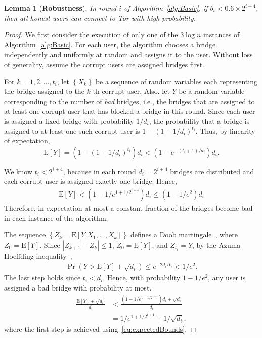 \documentclass[letterpaper,twocolumn,10pt]{article}
\newcommand{\ie}{i.e.}
\newcommand{\E}{\mathbf{\mathrm{E}}}
\newcommand{\jared}[1]{}
\newtheorem{lemma}{Lemma}
\newcommand{\sfsize}{\fontsize{0.73\baselineskip}{0.73\baselineskip}\selectfont}
\newcommand{\sans}[1]{\textsf{\sfsize \mbox{#1}}}
\newcommand{\sansb}[1]{\textbf{\sans{\mbox{#1}}}}
\begin{document}
\begin{lemma}[\sansb{Robustness}] \label{lem:robustness}
	In round $i$ of Algorithm~\ref{alg:Basic}, if ${b_i < 0.6 \times 2^{i+4}}$, then all honest users can connect to Tor with high probability.
\end{lemma}
\begin{proof}
	We first consider the execution of only one of the $3\log{n}$ instances of Algorithm~\ref{alg:Basic}. For each user, the algorithm chooses a bridge independently and uniformly at random and assigns it to the user. Without loss of generality, assume the corrupt users are assigned bridges first.
	
	For ${k=1,2,...,t_i}$, let $\left\{X_k\right\}$ be a sequence of random variables each representing the bridge assigned to the $k$-th corrupt user. Also, let $Y$ be a random variable corresponding to the number of \emph{bad} bridges, \ie, the bridges that are assigned to at least one corrupt user that has blocked a bridge in this round.  Since each user is assigned a fixed bridge with probability $1/d_i$, the probability that a bridge is assigned to at least one such corrupt user is ${1-(1-1/d_i)^{t_i}}$.  Thus, by linearity of expectation,
	\[\E[Y] = \left(1 - \left(1-1/d_i\right)^{t_i}\right)d_i < (1 - e^{-(t_i+1)/d_i})d_i.\]
	
	We know ${t_i < 2^{i+4}}$, because in each round ${d_i = 2^{i+4}}$ bridges are distributed and each corrupt user is assigned exactly one bridge. \jared{This is confusing.  You say that Y is the number of bridges assigned to at least one corrupt user, but then you use $t_i$ here which only counts the number of corrupt users that have *blocked* bridges.} Hence, 
	\begin{align}
	\E[Y] < (1 - 1/e^{1+1/2^{i+4}})d_i \leq (1 - 1/e^2)d_i \label{eq:expectedBounds}
	\end{align}
	Therefore, in expectation at most a constant fraction of the bridges become bad in each instance of the algorithm. 
	
	The sequence ${\left\{Z_k = \E[Y|X_1,...,X_k]\right\}}$ defines a Doob martingale~\cite[Chapter~5]{dubhashi:2009}, where ${Z_0 = \E[Y]}$.  Since ${|Z_{k+1} - Z_k| \leq 1}$, ${Z_0 = \E[Y]}$, and ${Z_{t_i} = Y}$, by the Azuma-Hoeffding inequality~\cite[Theorem 5.2]{dubhashi:2009},
	\begin{align}
	\Pr(Y > \E[Y] + \sqrt{d_i}) \leq e^{-2d_i/t_i} < 1/e^2. \label{eq:p1}
	\end{align}
	The last step holds since ${t_i < d_i}$. Hence, with probability $1-1/e^2$, any user is assigned a bad bridge with probability at most.
	\begin{align}
	\frac{\E[Y] + \sqrt{d_i}}{d_i} &< \frac{(1-1/e^{1+1/2^{i+4}})d_i + \sqrt{d_i}}{d_i} \nonumber \\ &= 1/e^{1+1/2^{i+4}} + 1/\sqrt{d_i}, \label{eq:p2}
	\end{align}
	where the first step is achieved using~\eqref{eq:expectedBounds}.
	

\end{proof}
\end{document}
